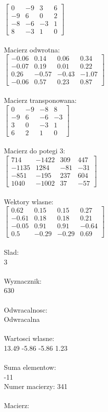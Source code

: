 \documentclass[a4paper,12pt]{article}
\begin{document}
$\begin{bmatrix} 0&-9&3&6\\-9&6&0&2\\-8&-6&-3&1\\8&-3&1&0 \end{bmatrix}$
\\
\\
Macierz odwrotna:\\

$\begin{bmatrix} -0.06&0.14&0.06&0.34\\-0.07&0.19&0.01&0.22\\0.26&-0.57&-0.43&-1.07\\-0.06&0.57&0.23&0.87 \end{bmatrix}$
\\
\\
Macierz transponowana:\\

$\begin{bmatrix} 0&-9&-8&8\\-9&6&-6&-3\\3&0&-3&1\\6&2&1&0 \end{bmatrix}$
\\
\\
Macierz do potegi 3:\\

$\begin{bmatrix} 714&-1422&309&447\\-1135&1284&-81&-31\\-851&-195&237&604\\1040&-1002&37&-57 \end{bmatrix}$
\\
\\
Wektory wlasne:\\

$\begin{bmatrix} 0.62&0.15&0.15&0.27\\-0.61&0.18&0.18&0.21\\-0.05&0.91&0.91&-0.64\\0.5&-0.29&-0.29&0.69 \end{bmatrix}$
\\
\\
Slad:\\
3
\\
\\
Wyznacznik:\\
630
\\
\\
Odwracalnosc:\\
Odwracalna
\\
\\
Wartosci wlasne:\\
13.49 -5.86 -5.86 1.23
\\
\\
Suma elementow:\\
-11
\\
\newpage
Numer macierzy:
341
\\
\\
Macierz:\\
\end{document}
